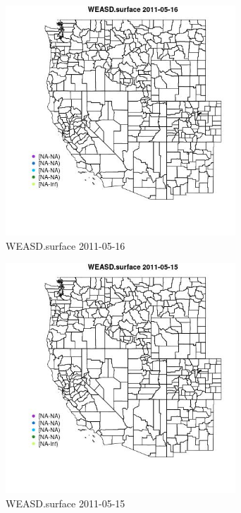 \begin{figure} 
\centering  
\includegraphics[width=0.77\textwidth]{Code_Outputs/ML_input_report_ML_input_PM25_Step5_part_d_de_duplicated_aves_ML_input_MapObsWEASDsurface2011-05-16.jpg} 
\caption{\label{fig:ML_input_report_ML_input_PM25_Step5_part_d_de_duplicated_aves_ML_inputMapObsWEASDsurface2011-05-16}WEASD.surface 2011-05-16} 
\end{figure} 
 

\begin{figure} 
\centering  
\includegraphics[width=0.77\textwidth]{Code_Outputs/ML_input_report_ML_input_PM25_Step5_part_d_de_duplicated_aves_ML_input_MapObsWEASDsurface2011-05-15.jpg} 
\caption{\label{fig:ML_input_report_ML_input_PM25_Step5_part_d_de_duplicated_aves_ML_inputMapObsWEASDsurface2011-05-15}WEASD.surface 2011-05-15} 
\end{figure} 
 

